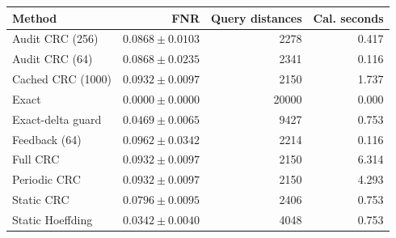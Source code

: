 \begin{tabular}{lrrr}
\hline
Method & FNR & Query distances & Cal. seconds \\
\hline
Audit CRC (256) & $0.0868 \pm 0.0103$ & 2278 & 0.417 \\
Audit CRC (64) & $0.0868 \pm 0.0235$ & 2341 & 0.116 \\
Cached CRC (1000) & $0.0932 \pm 0.0097$ & 2150 & 1.737 \\
Exact & $0.0000 \pm 0.0000$ & 20000 & 0.000 \\
Exact-delta guard & $0.0469 \pm 0.0065$ & 9427 & 0.753 \\
Feedback (64) & $0.0962 \pm 0.0342$ & 2214 & 0.116 \\
Full CRC & $0.0932 \pm 0.0097$ & 2150 & 6.314 \\
Periodic CRC & $0.0932 \pm 0.0097$ & 2150 & 4.293 \\
Static CRC & $0.0796 \pm 0.0095$ & 2406 & 0.753 \\
Static Hoeffding & $0.0342 \pm 0.0040$ & 4048 & 0.753 \\
\hline
\end{tabular}
